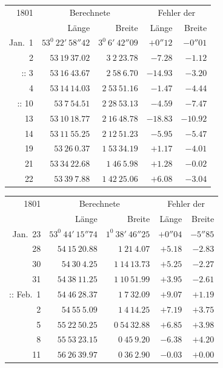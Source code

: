 \begin{center}
{\small\setlength{\tabcolsep}{4pt}
\begin{tabular}{r|r|r|r|r}
1801&\multicolumn{2}{c|}{Berechnete}&\multicolumn{2}{c}{Fehler der}\\
&Länge&Breite&Länge&Breite\\\hline
Jan.\ 1&$53^0\ 22'\ 58''42$&$3^0\ 6'\ 42''09$&$+0''12$&$-0''01$\\
2&$53\ 19\ 37.02$&$3\ 2\ 23.78$&$-7.28$&$-1.12$\\
$\mathord{:}\mathord{:}$ 3&$53\ 16\ 43.67$&$2\ 58\ 6.70$&$-14.93$&$-3.20$\\
4&$53\ 14\ 14.03$&$2\ 53\ 51.16$&$-1.47$&$-4.44$\\
$\mathord{:}\mathord{:}$ 10&$53\ 7\ 54.51$&$2\ 28\ 53.13$&$-4.59$&$-7.47$\\
13&$53\ 10\ 18.77$&$2\ 16\ 48.78$&$-18.83$&$-10.92$\\
14&$53\ 11\ 55.25$&$2\ 12\ 51.23$&$-5.95$&$-5.47$\\
19&$53\ 26\ 0.37$&$1\ 53\ 34.19$&$+1.17$&$-4.01$\\
21&$53\ 34\ 22.68$&$1\ 46\ 5.98$&$+1.28$&$-0.02$\\
22&$53\ 39\ 7.88$&$1\ 42\ 25.06$&$+6.08$&$-3.04$
\end{tabular}
\par\medskip
\begin{tabular}{r|r|r|r|r}
1801&\multicolumn{2}{c|}{Berechnete}&\multicolumn{2}{c}{Fehler der}\\
&Länge&Breite&Länge&Breite\\\hline
Jan.\ 23&$53^0\ 44'\ 15''74$&$1^0\ 38'\ 46''25$&$+0''04$&$-5''85$\\
28&$54\ 15\ 20.88$&$1\ 21\ 4.07$&$+5.18$&$-2.83$\\
30&$54\ 30\ 4.25$&$1\ 14\ 13.73$&$+5.25$&$-2.27$\\
31&$54\ 38\ 11.25$&$1\ 10\ 51.99$&$+3.95$&$-2.61$\\
$\mathord{:}\mathord{:}$ Feb.\ 1&$54\ 46\ 28.37$&$1\ 7\ 32.09$&$+9.07$&$+1.19$\\
2&$54\ 55\ 5.09$&$1\ 4\ 14.25$&$+7.19$&$+3.75$\\
5&$55\ 22\ 50.25$&$0\ 54\ 32.88$&$+6.85$&$+3.98$\\
8&$55\ 53\ 23.15$&$0\ 45\ 9.20$&$-6.38$&$+4.20$\\
11&$56\ 26\ 39.97$&$0\ 36\ 2.90$&$-0.03$&$+0.00$
\end{tabular}}
\end{center}

